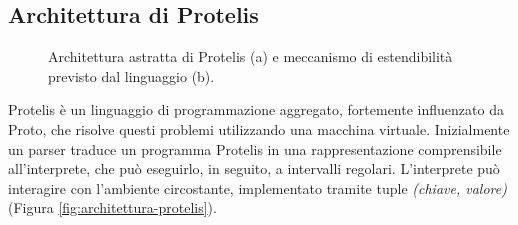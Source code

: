 \subsection{Architettura di Protelis}\label{subsec:Architettura di Protelis}
\begin{figure}
  \hfill
  \caption{Architettura astratta di Protelis (a) e meccanismo di estendibilità
    previsto dal linguaggio (b).}
\end{figure}

Protelis è un linguaggio di programmazione aggregato, fortemente influenzato da
Proto\cite{Proto}, che risolve questi problemi utilizzando una macchina
virtuale\cite{Protelis}.  Inizialmente un parser traduce un programma Protelis
in una rappresentazione comprensibile all'interprete, che può eseguirlo, in
seguito, a intervalli regolari. L'interprete può interagire con l'ambiente
circostante, implementato tramite tuple \textit{(chiave, valore)} (Figura
\ref{fig:architettura-protelis}).

